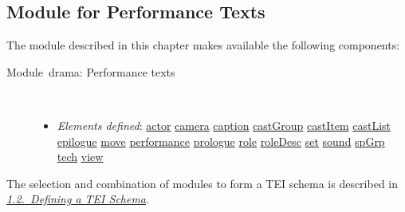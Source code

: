 \subsection[{Module for Performance Texts}]{Module for Performance Texts}\par
The module described in this chapter makes available the following components: \begin{description}

\item[{Module drama: Performance texts}]\hspace{1em}\hfill\linebreak
\mbox{}\\[-10pt] \begin{itemize}
\item {\itshape Elements defined}: \hyperref[TEI.actor]{actor} \hyperref[TEI.camera]{camera} \hyperref[TEI.caption]{caption} \hyperref[TEI.castGroup]{castGroup} \hyperref[TEI.castItem]{castItem} \hyperref[TEI.castList]{castList} \hyperref[TEI.epilogue]{epilogue} \hyperref[TEI.move]{move} \hyperref[TEI.performance]{performance} \hyperref[TEI.prologue]{prologue} \hyperref[TEI.role]{role} \hyperref[TEI.roleDesc]{roleDesc} \hyperref[TEI.set]{set} \hyperref[TEI.sound]{sound} \hyperref[TEI.spGrp]{spGrp} \hyperref[TEI.tech]{tech} \hyperref[TEI.view]{view}
\end{itemize} 
\end{description}  The selection and combination of modules to form a TEI schema is described in \textit{\hyperref[STIN]{1.2.\ Defining a TEI Schema}}.